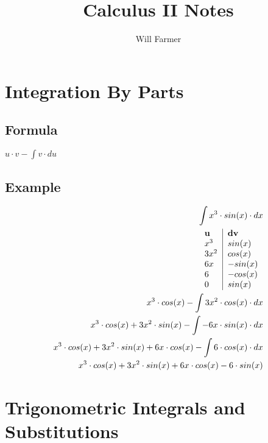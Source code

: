 \documentclass{article}
\begin{document}
\title{Calculus II Notes}
\author{Will Farmer}
\maketitle

\section{Integration By Parts}
\subsection*{Formula}
$ u \cdot v-\int v \cdot du $
\subsection*{Example}
\begin{equation}
\begin{aligned}
\int x^3 \cdot sin(x) \cdot dx & \\
\begin{tabular}{l | l}
\textbf{u} & \textbf{dv} \\
$x^3$ & $sin(x)$ \\
$3x^2$ & $cos(x)$ \\
$6x$ & $-sin(x)$ \\
$6$ & $-cos(x)$ \\
$0$ & $sin(x)$ \\
\end{tabular}\\
x^3 \cdot cos(x) - \int 3x^2 \cdot cos(x) \cdot dx & \\
x^3 \cdot cos(x) + 3x^2 \cdot sin(x) - \int -6x \cdot sin(x) \cdot dx & \\
x^3 \cdot cos(x) + 3x^2 \cdot sin(x) + 6x \cdot cos(x) - \int 6 \cdot cos(x) \cdot dx & \\
x^3 \cdot cos(x) + 3x^2 \cdot sin(x) + 6x \cdot cos(x) - 6 \cdot sin(x) & \\
\end{aligned}
\end{equation}

\section{Trigonometric Integrals and Substitutions}
\end{document}
